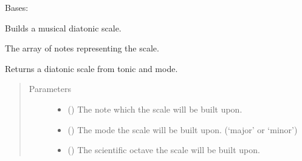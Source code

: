 \documentclass[letterpaper,10pt,english]{sphinxmanual}
\begin{document}

\begin{fulllineitems}
\label{\detokenize{birdears:birdears.scale.DiatonicScale}}
Bases: {\hyperref[\detokenize{index:birdears.scale.ScaleBase}]{}}

Builds a musical diatonic scale.

\begin{fulllineitems}
\label{\detokenize{birdears:birdears.scale.DiatonicScale.scale}}
 \textendash{} The array of notes representing the scale.

\end{fulllineitems}


\begin{fulllineitems}
\label{\detokenize{birdears:birdears.scale.DiatonicScale.__init__}}
Returns a diatonic scale from tonic and mode.
\begin{quote}\begin{description}
\item[{Parameters}] \leavevmode\begin{itemize}
\item {} 
 () \textendash{} The note which the scale will be built upon.

\item {} 
 () \textendash{} The mode the scale will be built upon.
(‘major’ or ‘minor’)

\item {} 
 () \textendash{} The scientific octave the scale will be built upon.


\end{itemize}
\end{description}
\end{quote}
\end{fulllineitems}
\end{fulllineitems}
\end{document}
